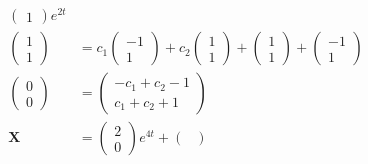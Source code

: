\documentclass{article}
\begin{document}
\begin{align*}
\begin{pmatrix}
                               1
                             \end{pmatrix} e^{2 t}                                                                                                      \\
  \begin{pmatrix}
    1 \\
    1
  \end{pmatrix} & = c_1 \begin{pmatrix}
                          -1 \\
                          1
                        \end{pmatrix} + c_2 \begin{pmatrix}
                                              1 \\
                                              1
                                            \end{pmatrix} + \begin{pmatrix}
                                                              1 \\
                                                              1
                                                            \end{pmatrix} + \begin{pmatrix}
                                                                              -1 \\
                                                                              1
                                                                            \end{pmatrix}                                                              \\
  \begin{pmatrix}
    0 \\
    0
  \end{pmatrix} & = \begin{pmatrix}
                      -c_1 + c_2 - 1 \\
                      c_1 + c_2 + 1
                    \end{pmatrix}                                                                                                                      \\
  \mathbf{X}      & = \begin{pmatrix}
                        2 \\
                        0
                      \end{pmatrix} e^{4 t} + \begin{pmatrix}

\end{pmatrix}
\end{align*}
\end{document}
